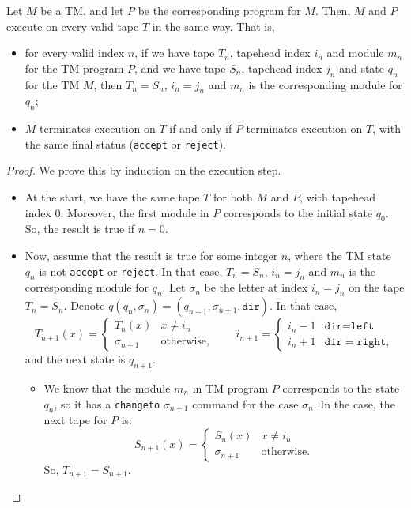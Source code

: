 \begin{appendices}
\begin{theorem} \label{thm:TM_to_TMP}
    Let $M$ be a TM, and let $P$ be the corresponding program for $M$. Then, $M$ and $P$ execute on every valid tape $T$ in the same way. That is, 
    \begin{itemize}
        \item for every valid index $n$, if we have tape $T_n$, tapehead index $i_n$ and module $m_n$ for the TM program $P$, and we have tape $S_n$, tapehead index $j_n$ and state $q_n$ for the TM $M$, then $T_n = S_n$, $i_n = j_n$ and $m_n$ is the corresponding module for $q_n$;
        \item $M$ terminates execution on $T$ if and only if $P$ terminates execution on $T$, with the same final status (\texttt{accept} or \texttt{reject}).
    \end{itemize}
\end{theorem}
\begin{proof}
    We prove this by induction on the execution step. 
    \begin{itemize}
        \item At the start, we have the same tape $T$ for both $M$ and $P$, with tapehead index $0$. Moreover, the first module in $P$ corresponds to the initial state $q_0$. So, the result is true if $n = 0$.
        
        \item Now, assume that the result is true for some integer $n$, where the TM state $q_n$ is not \texttt{accept} or \texttt{reject}. In that case, $T_n = S_n$, $i_n = j_n$ and $m_n$ is the corresponding module for $q_n$. Let $\sigma_n$ be the letter at index $i_n = j_n$ on the tape $T_n = S_n$. Denote $q(q_n, \sigma_n) = (q_{n+1}, \sigma_{n+1}, \texttt{dir})$. In that case,
        \[T_{n+1}(x) = \begin{cases}
            T_n(x) & x \neq i_n \\
            \sigma_{n+1} & \text{otherwise},
        \end{cases} \qquad i_{n+1} = \begin{cases}
            i_n - 1 & \texttt{dir} = \texttt{left} \\
            i_n + 1 & \texttt{dir} = \texttt{right},
        \end{cases}\]
        and the next state is $q_{n+1}$. 
        
        \begin{itemize}
            \item We know that the module $m_n$ in TM program $P$ corresponds to the state $q_n$, so it has a \texttt{changeto} $\sigma_{n+1}$ command for the case $\sigma_n$. In the case, the next tape for $P$ is:
            \[S_{n+1}(x) = \begin{cases}
                S_n(x) & x \neq i_n \\
                \sigma_{n+1} & \text{otherwise}.
            \end{cases}\]
            So, $T_{n+1} = S_{n+1}$. 
            

\end{itemize}
\end{itemize}
\end{proof}
\end{appendices}
